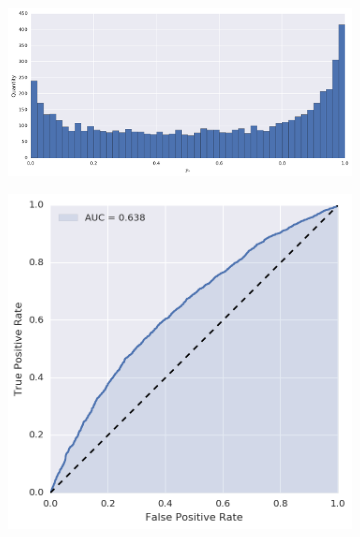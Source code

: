 \begin{figure}[!h]
\centering
\begin{subfigure}[t]{\textwidth}
	\centering
	\includegraphics[height=.175\textheight]{figures/bayes/least1/hist_time.png}
\end{subfigure}
\begin{subfigure}[b]{.49\textwidth}
	\raggedleft{}
	\includegraphics[height=.175\textheight]{figures/bayes/least1/roc_time.png}
\end{subfigure}
\begin{subfigure}[b]{.49\textwidth}
	\raggedright{}

\end{subfigure}
\end{figure}
